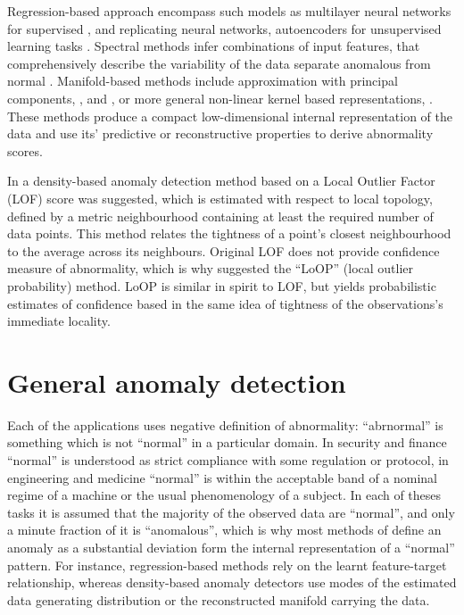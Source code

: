 \documentclass{extarticle}
\begin{document}
Regression-based approach encompass such models as multilayer neural networks for
supervised \cite{augusteijn2002}, and replicating neural networks, autoencoders
for unsupervised learning tasks \cite{hawkins2002,williams2002}. Spectral methods
infer combinations of input features, that comprehensively describe the variability
of the data separate anomalous from normal \cite{chandola2009}. Manifold-based
methods include approximation with principal components, \cite{dutta2007,shyu2003},
and \cite{jolliffe2014}, or more general non-linear kernel based representations,
\cite{hoffmann2007,scholkopf1998}. These methods produce a compact low-dimensional
internal representation of the data and use its' predictive or reconstructive properties
to derive abnormality scores.

In \cite{breunig2000} a density-based anomaly detection method based on a Local Outlier
Factor (LOF) score was suggested, which is estimated with respect to local topology,
defined by a metric neighbourhood containing at least the required number of data
points. This method relates the tightness of a point's closest neighbourhood to the
average across its neighbours. Original LOF does not provide confidence measure of
abnormality, which is why \cite{kriegel2009} suggested the ``LoOP'' (local outlier
probability) method. LoOP is similar in spirit to LOF, but yields probabilistic
estimates of confidence based in the same idea of tightness of the observations's
immediate locality.


\section{General anomaly detection} %
\label{sec:general_anomaly_detection}


Each of the applications uses negative definition of abnormality: ``abrnormal'' is
something which is not ``normal'' in a particular domain. In security and finance
``normal'' is understood as strict compliance with some regulation or protocol, in
engineering and medicine ``normal'' is within the acceptable band of a nominal regime
of a machine or the usual phenomenology of a subject. In each of theses tasks it is
assumed that the majority of the observed data are ``normal'', and only a minute
fraction of it is ``anomalous'', which is why most methods of define an anomaly
as a substantial deviation form the internal representation of a ``normal'' pattern.
For instance, regression-based methods rely on the learnt feature-target relationship,
whereas density-based anomaly detectors use modes of the estimated data generating
distribution or the reconstructed manifold carrying the data.
\end{document}
